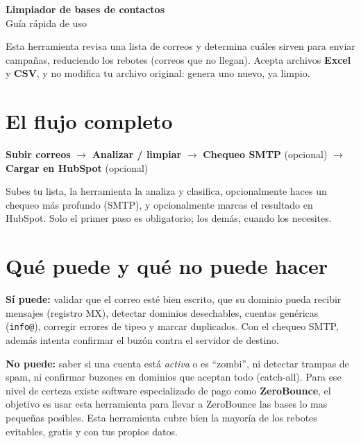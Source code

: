 \documentclass[12pt]{article}
\begin{document}
\begin{center}
    {\LARGE\bfseries\color{azul} Limpiador de bases de contactos}\\[2pt]
    {\small\color{gris} Guía rápida de uso}
\end{center}

\vspace{2pt}

\noindent Esta herramienta revisa una lista de correos y determina cuáles sirven para
enviar campañas, reduciendo los rebotes (correos que no llegan). Acepta archivos
\textbf{Excel} y \textbf{CSV}, y no modifica tu archivo original: genera uno nuevo, ya limpio.

\section{El flujo completo}
\begin{center}
    \textbf{Subir correos} $\rightarrow$ \textbf{Analizar / limpiar} $\rightarrow$
    \textbf{Chequeo SMTP} (opcional) $\rightarrow$ \textbf{Cargar en HubSpot} (opcional)
\end{center}
\noindent Subes tu lista, la herramienta la analiza y clasifica, opcionalmente haces un
chequeo más profundo (SMTP), y opcionalmente marcas el resultado en HubSpot. Solo el
primer paso es obligatorio; los demás, cuando los necesites.

\section{Qué puede y qué no puede hacer}
\textbf{Sí puede:} validar que el correo esté bien escrito, que su dominio pueda recibir
mensajes (registro MX), detectar dominios desechables, cuentas genéricas (\texttt{info@}),
corregir errores de tipeo y marcar duplicados. Con el chequeo SMTP, además intenta
confirmar el buzón contra el servidor de destino.

\textbf{No puede:} saber si una cuenta está \emph{activa} o es ``zombi'', ni detectar
trampas de spam, ni confirmar buzones en dominios que aceptan todo (catch-all). Para ese
nivel de certeza existe software especializado de pago como \textbf{ZeroBounce}, el objetivo es usar esta herramienta para llevar a ZeroBounce las bases lo mas pequeñas posibles. Esta
herramienta cubre bien la mayoría de los rebotes evitables, gratis y con tus propios datos.
\end{document}

